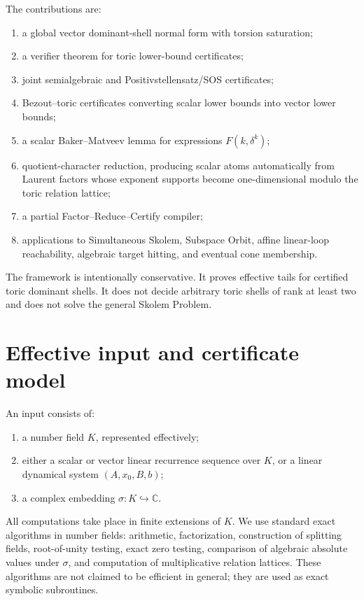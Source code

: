 \documentclass[11pt]{article}
\newcommand{\C}{\mathbb C}
\begin{document}
The contributions are:
\begin{enumerate}
\item a global vector dominant-shell normal form with torsion saturation;
\item a verifier theorem for toric lower-bound certificates;
\item joint semialgebraic and Positivstellensatz/SOS certificates;
\item Bezout--toric certificates converting scalar lower bounds into vector lower bounds;
\item a scalar Baker--Matveev lemma for expressions \(F(k,\delta^k)\);
\item quotient-character reduction, producing scalar atoms automatically from Laurent factors whose exponent supports become one-dimensional modulo the toric relation lattice;
\item a partial Factor--Reduce--Certify compiler;
\item applications to Simultaneous Skolem, Subspace Orbit, affine linear-loop reachability, algebraic target hitting, and eventual cone membership.
\end{enumerate}

The framework is intentionally conservative. It proves effective tails for certified toric dominant shells. It does not decide arbitrary toric shells of rank at least two and does not solve the general Skolem Problem.

\section{Effective input and certificate model}

An input consists of:
\begin{enumerate}
\item a number field \(K\), represented effectively;
\item either a scalar or vector linear recurrence sequence over \(K\), or a linear dynamical system \((A,x_0,B,b)\);
\item a complex embedding \(\sigma:K\hookrightarrow \C\).
\end{enumerate}

All computations take place in finite extensions of \(K\). We use standard exact algorithms in number fields: arithmetic, factorization, construction of splitting fields, root-of-unity testing, exact zero testing, comparison of algebraic absolute values under \(\sigma\), and computation of multiplicative relation lattices. These algorithms are not claimed to be efficient in general; they are used as exact symbolic subroutines.
\end{document}
